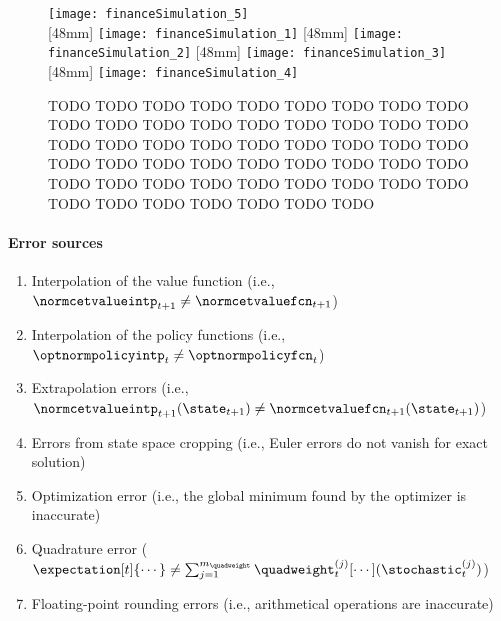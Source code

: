 
\begin{figure}
  \texttt{[image: financeSimulation\_5]}%
  \\[2mm]%
  [48mm]{%
    \texttt{[image: financeSimulation\_1]}%
  }%
  \hfill%
  [48mm]{%
    \texttt{[image: financeSimulation\_2]}%
  }%
  \hfill%
  [48mm]{%
    \texttt{[image: financeSimulation\_3]}%
  }%
  \\[2mm]%
  [48mm]{%
    \texttt{[image: financeSimulation\_4]}%
  }%
  \hfill%
  \begin{minipage}[b]{92mm}%
    \caption[TODO]{%
      TODO TODO TODO TODO TODO TODO TODO TODO TODO TODO TODO TODO TODO
      TODO TODO TODO TODO TODO TODO TODO TODO TODO TODO TODO TODO TODO
      TODO TODO TODO TODO TODO TODO TODO TODO TODO TODO TODO TODO TODO
      TODO TODO TODO TODO TODO TODO TODO TODO TODO TODO TODO TODO TODO%
    }%
    \vspace*{-6mm}%
    \label{fig:financeSimulation}%
  \end{minipage}%
\end{figure}

\dummytext[3]{}

\paragraph{Error sources}


\begin{enumerate}
  \item
  Interpolation of the value function
  (i.e., $\normcetvalueintp_{t+1} \not= \normcetvaluefcn_{t+1}$)
  
  \item
  Interpolation of the policy functions
  (i.e., $\optnormpolicyintp_t \not= \optnormpolicyfcn_t$)
  
  \item
  Extrapolation errors
  (i.e., $
    \normcetvalueintp_{t+1}(\state_{t+1})
    \not= \normcetvaluefcn_{t+1}(\state_{t+1})
  $)
  
  \item
  Errors from state space cropping
  (i.e., Euler errors do not vanish for exact solution)
  
  \item
  Optimization error
  (i.e., the global minimum found by the optimizer is inaccurate)
  
  \item
  Quadrature error
  ($
    \expectation[t]{\cdots}
    \not= \sum_{j=1}^{m_{\quadweight}} \quadweight_t^{(j)}
    [\cdots](\stochastic_t^{(j)})
  $)
  
  \item
  Floating-point rounding errors
  (i.e., arithmetical operations are inaccurate)
\end{enumerate}

